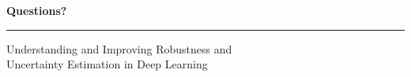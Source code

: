 \documentclass[64pt,aspectratio=169]{beamer}
\begin{document}
	\begingroup
	\begin{frame}[noframenumbering]{}
		\Large
		
		\vspace*{-0.2cm}
		\begin{minipage}{0.27\textwidth}
			\bfseries\huge Questions?
		\end{minipage}
		\hfill
		\begin{minipage}{0.01\textwidth}
			{\color{gray}\rule{0.5pt}{1.5cm}}
		\end{minipage}
		\hfill
		\begin{minipage}{0.7\textwidth}
			\color{gray}
			Understanding and Improving
			Robustness and\\
			Uncertainty Estimation
			in Deep Learning
		\end{minipage}
		\vskip 0.35cm
		

\end{frame}
\end{document}
